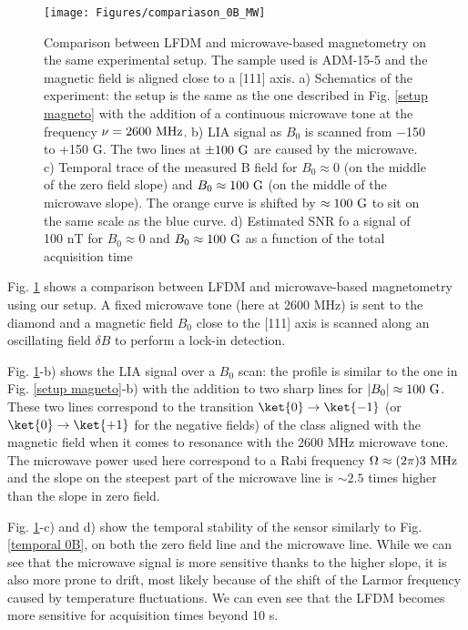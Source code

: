 \documentclass[a4paper,11pt]{report}
\begin{document}
\begin{figure}[h!]
\centering
\texttt{[image: Figures/compariason\_0B\_MW]}
\caption{Comparison between LFDM and microwave-based magnetometry on the same experimental setup. The sample used is ADM-15-5 and the magnetic field is aligned close to a [111] axis. a) Schematics of the experiment: the setup is the same as the one described in Fig. \ref{setup magneto} with the addition of a continuous microwave tone at the frequency $\nu=2600\ \rm MHz$. b) LIA signal as $B_0$ is scanned from $-$150 to +150 G. The two lines at $\pm 100\ \rm G$ are caused by the microwave. c) Temporal trace of the measured B field for $B_0 \approx 0$ (on the middle of the zero field slope) and $B_0 \approx 100\ \rm G$ (on the middle of the microwave slope). The orange curve is shifted by $\approx 100\ \rm G$ to sit on the same scale as the blue curve. d) Estimated SNR fo a signal of 100 nT for $B_0 \approx 0$ and $B_0 \approx 100\ \rm G$ as a function of the total acquisition time}
\label{comparaison 0B MW}
\end{figure}

Fig. \ref{comparaison 0B MW} shows a comparison between LFDM and microwave-based magnetometry using our setup. A fixed microwave tone (here at 2600 MHz) is sent to the diamond and a magnetic field $B_0$ close to the [111] axis is scanned along an oscillating field $\delta B$ to perform a lock-in detection. 

Fig. \ref{comparaison 0B MW}-b) shows the LIA signal over a $B_0$ scan: the profile is similar to the one in Fig. \ref{setup magneto}-b) with the addition to two sharp lines for $|B_0| \approx 100\ \rm G$. These two lines correspond to the transition $\ket{0} \to \ket{-1}$ (or $\ket{0} \to \ket{+1}$ for the negative fields) of the class aligned with the magnetic field when it comes to resonance with the 2600 MHz microwave tone. The microwave power used here correspond to a Rabi frequency $\Omega \approx (2\pi) 3\ \rm MHz$ and the slope on the steepest part of the microwave line is $\sim 2.5$ times higher than the slope in zero field.

Fig. \ref{comparaison 0B MW}-c) and d) show the temporal stability of the sensor similarly to Fig. \ref{temporal 0B}, on both the zero field line and the microwave line. While we can see that the microwave signal is more sensitive thanks to the higher slope, it is also more prone to drift, most likely because of the shift of the Larmor frequency caused by temperature fluctuations. We can even see that the LFDM becomes more sensitive for acquisition times beyond 10 s.
\end{document}
